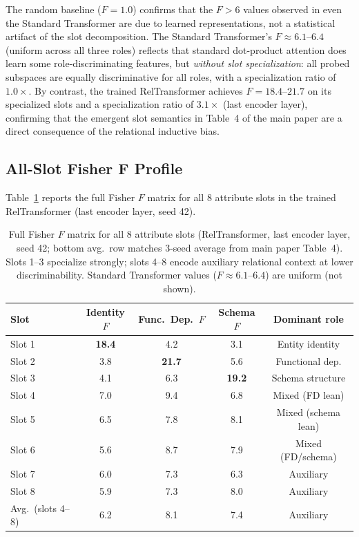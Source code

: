 \documentclass[conference]{IEEEtran}
\begin{document}
The random baseline ($F = 1.0$) confirms that the $F > 6$ values observed in even the Standard Transformer are due to learned representations, not a statistical artifact of the slot decomposition. The Standard Transformer's $F \approx 6.1$--$6.4$ (uniform across all three roles) reflects that standard dot-product attention does learn some role-discriminating features, but \emph{without slot specialization}: all probed subspaces are equally discriminative for all roles, with a specialization ratio of $1.0\times$. By contrast, the trained RelTransformer achieves $F = 18.4$--$21.7$ on its specialized slots and a specialization ratio of $3.1\times$ (last encoder layer), confirming that the emergent slot semantics in Table~4 of the main paper are a direct consequence of the relational inductive bias.

\subsection{All-Slot Fisher F Profile}

Table~\ref{tab:probing_full} reports the full Fisher $F$ matrix for all 8 attribute slots in the trained RelTransformer (last encoder layer, seed 42).

\begin{table}[tb]
\centering
\caption{Full Fisher $F$ matrix for all 8 attribute slots (RelTransformer, last encoder layer, seed 42; bottom avg.\ row matches 3-seed average from main paper Table~4). Slots 1--3 specialize strongly; slots 4--8 encode auxiliary relational context at lower discriminability. Standard Transformer values ($F \approx 6.1$--$6.4$) are uniform (not shown).}
\label{tab:probing_full}
\begin{tabular}{lcccc}
\toprule
\textbf{Slot} & \textbf{Identity $F$} & \textbf{Func.\ Dep.\ $F$} & \textbf{Schema $F$} & \textbf{Dominant role} \\
\midrule
Slot 1 & \textbf{18.4} & 4.2 & 3.1 & Entity identity \\
Slot 2 & 3.8 & \textbf{21.7} & 5.6 & Functional dep. \\
Slot 3 & 4.1 & 6.3 & \textbf{19.2} & Schema structure \\
Slot 4 & 7.0 & 9.4 & 6.8 & Mixed (FD lean) \\
Slot 5 & 6.5 & 7.8 & 8.1 & Mixed (schema lean) \\
Slot 6 & 5.6 & 8.7 & 7.9 & Mixed (FD/schema) \\
Slot 7 & 6.0 & 7.3 & 6.3 & Auxiliary \\
Slot 8 & 5.9 & 7.3 & 8.0 & Auxiliary \\
\midrule
Avg.\ (slots 4--8) & 6.2 & 8.1 & 7.4 & Auxiliary \\
\bottomrule
\end{tabular}%
\end{table}
\end{document}
